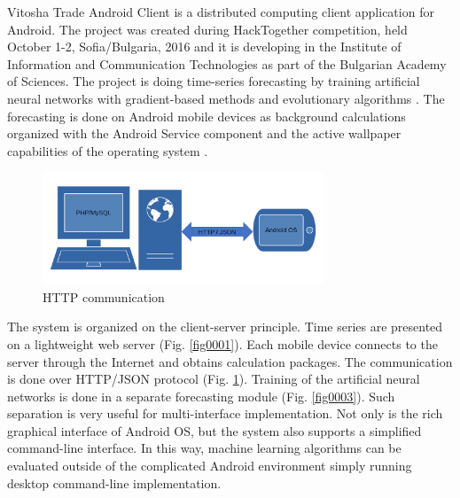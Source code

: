 \documentclass{ifacconf}
\begin{document}
Vitosha Trade Android Client \cite{Balabanov-2016-1} is a distributed computing client application for Android. The project was created during HackTogether competition, held October 1-2, Sofia/Bulgaria, 2016 and it is developing in the Institute of Information and Communication Technologies as part of the Bulgarian Academy of Sciences. The project is doing time-series forecasting by training artificial neural networks with gradient-based methods \cite{Tomov-2021-a} and evolutionary algorithms \cite{Tomov-2021-b}. The forecasting is done on Android mobile devices as background calculations organized with the Android Service component and the active wallpaper capabilities of the operating system \cite{Mateeva-2021-a}. 

\begin{figure}
\begin{center}
\includegraphics[width=8.4cm]{images/fig0002}
\caption{HTTP communication} 
\label{fig0002}
\end{center}
\end{figure}

The system is organized on the client-server principle. Time series are presented on a lightweight web server (Fig. \ref{fig0001}). Each mobile device connects to the server through the Internet and obtains calculation packages. The communication is done over HTTP/JSON protocol (Fig. \ref{fig0002}). Training of the artificial neural networks is done in a separate forecasting module (Fig. \ref{fig0003}). Such separation is very useful for multi-interface implementation. Not only is the rich graphical interface of Android OS, but the system also supports a simplified command-line interface. In this way, machine learning algorithms can be evaluated outside of the complicated Android environment simply running desktop command-line implementation. 
\end{document}
